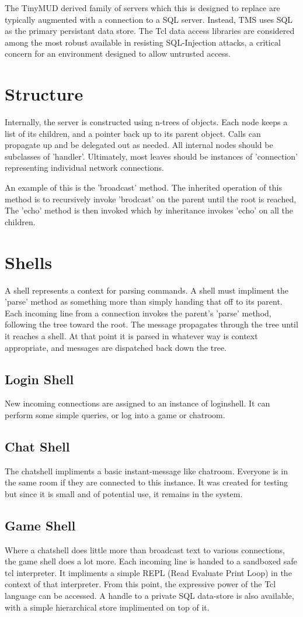 \documentclass[10pt,letterpaper,twoside]{book}
\begin{document}
The TinyMUD derived family of servers which this is designed to replace are typically augmented with a connection to a SQL server.
Instead, TMS uses SQL as the primary persistant data store.
The Tcl data access libraries are considered among the most robust available in resisting SQL-Injection attacks,
a critical concern for an environment designed to allow untrusted access.
\chapter{Structure}
Internally, the server is constructed using n-trees of objects.
Each node keeps a list of its children, and a pointer back up to its parent object.
Calls can propagate up and be delegated out as needed.
All internal nodes should be subclasses of 'handler'.
Ultimately, most leaves should be instances of 'connection' representing individual network connections.

An example of this is the 'broadcast' method.
The inherited operation of this method is to recursively invoke 'brodcast' on the parent until the root is reached,
The 'echo' method is then invoked which by inheritance invokes 'echo' on all the children.
\chapter{Shells}
A shell represents a context for parsing commands.
A shell must impliment the 'parse' method as something more than simply handing that off to its parent.
Each incoming line from a connection invokes the parent's 'parse' method, following the tree toward the root.
The message propagates through the tree until it reaches a shell.
At that point it is parsed in whatever way is context appropriate, and messages are dispatched back down the tree.
\section{Login Shell}
New incoming connections are assigned to an instance of loginshell.
It can perform some simple queries, or log into a game or chatroom.
\section{Chat Shell}
The chatshell impliments a basic instant-message like chatroom.
Everyone is in the same room if they are connected to this instance.
It was created for testing but since it is small and of potential use, it remains in the system.
\section{Game Shell}
Where a chatshell does little more than broadcast text to various connections, the game shell does a lot more.
Each incoming line is handed to a sandboxed safe tcl interpreter.
It impliments a simple REPL (Read Evaluate Print Loop) in the context of that interpreter.
From this point, the expressive power of the Tcl language can be accessed.
A handle to a private SQL data-store is also available, with a simple hierarchical store implimented on top of it.
\end{document}
